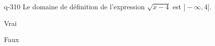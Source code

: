 \begin{truefalse}{q-310}
Le domaine de définition de l'expression $\sqrt{x-4}$ est $]-\infty,4]$.
\item Vrai
\item* Faux
\end{truefalse}

